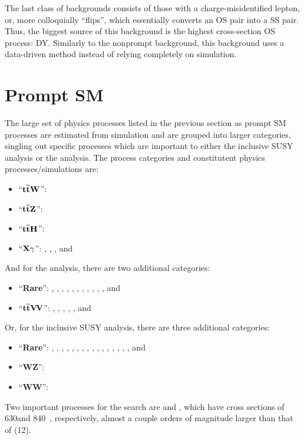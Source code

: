 The last class of backgrounds consists of those with a charge-misidentified lepton, or,
more colloquially ``flips'', which essentially
converts an OS pair into a SS pair. Thus, the biggest source of this background is 
the highest cross-section OS process: DY. Similarly to
the nonprompt background, this background uses a data-driven method instead of 
relying completely on simulation.

\section{Prompt SM}

The large set of physics processes listed in the previous section as prompt SM processes
are estimated from simulation and are grouped into larger categories, singling out
specific processes which are important to either  the inclusive SUSY analysis
or the \smft analysis. The process categories and constitutent physics processes/simulations
are:

\begin{itemize}
    \item ``$\mathbf{t\bar{t} W}$'': \ttW
    \item ``$\mathbf{t\bar{t} Z}$'': \ttZ
    \item ``$\mathbf{t\bar{t}H}$'': \ttH
    \item ``$\mathbf{X\gamma}$'': \Wgamma, \Zgamma, \ttgamma, and \tgamma
\end{itemize}

And for the \smft analysis, there are two additional categories:
\begin{itemize}
    \item ``\textbf{Rare}'': \ttt, \tttW, \ZZ, \WH, \ZH, \WZgamma, \WWgamma, \tZgamma, \tWZ, \WpWp, \WZ, and \WW
    \item ``$\mathbf{t\bar{t}V\!V}$'': \ttWW, \ttWZ, \ttZZ, \ttWH, \ttZH, and \ttHH
\end{itemize}

Or, for the inclusive SUSY analysis, there are three additional categories:
\begin{itemize}
    \item ``\textbf{Rare}'': \ttt, \tttW, \ZZ, \WW, \WH, \ZH, \WZgamma, \WWgamma, \tZgamma, \tWZ, \ttWW, \ttWZ, \ttZZ, \ttWH, \ttZH, \ttHH, and \tttt
    \item ``\textbf{WZ}'': \WZ
    \item ``\textbf{WW}'': \WpWp
\end{itemize}

Two important processes for the \smft search are \ttW and \ttZ, which have cross sections
of 630\ifb and 840\ifb~\cite{CMS:Sirunyan2017uzs}, respectively, almost a couple orders of magnitude larger than that of
\tttt (12\ifb).

